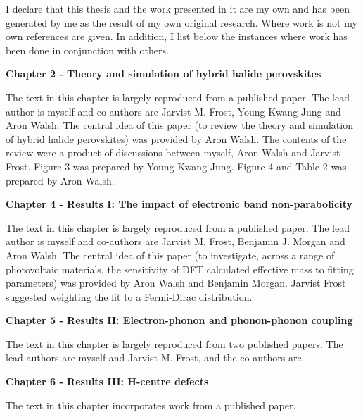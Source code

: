 I declare that this thesis and the work presented in it are my own and has been generated by me as the result of my own original research. Where work is not my own references are given. In addition, I list below the instances where work has been done in conjunction with others.
\vspace{\frontmatterbaselineskip}

\textbf{Chapter 2 - Theory and simulation of hybrid halide perovskites } 

The text in this chapter is largely reproduced from a published paper.\autocite{Whalley2017} The lead author is myself and co-authors are Jarvist M. Frost, Young-Kwang Jung and Aron Walsh.
The central idea of this paper (to review the theory and simulation of hybrid halide perovskites) was provided by Aron Walsh. The contents of the review were a product of discussions between myself, Aron Walsh and Jarvist Frost. Figure 3 was prepared by Young-Kwang Jung. Figure 4 and Table 2 was prepared by Aron Walsh. 

\vspace{\frontmatterbaselineskip}

\textbf{Chapter 4  - Results I: The impact of electronic band non-parabolicity}

The text in this chapter is largely reproduced from a published paper.\autocite{Whalley2019} The lead author is myself and co-authors are Jarvist M. Frost, Benjamin J. Morgan and Aron Walsh. The central idea of this paper (to investigate, across a range of photovoltaic materials, the sensitivity of DFT calculated effective mass to fitting parameters) was provided by Aron Walsh and Benjamin Morgan. Jarvist Frost suggested weighting the fit to a Fermi-Dirac distribution. 

\vspace{\frontmatterbaselineskip}

\textbf{Chapter 5  - Results II: Electron-phonon and phonon-phonon coupling}

The text in this chapter is largely reproduced from two published papers.\autocite{Whalley2016,Whalley2017a} The lead authors are myself\autocite{Whalley2016} and Jarvist M. Frost,\autocite{2017a} and the co-authors are 
\vspace{\frontmatterbaselineskip}

\textbf{Chapter 6  - Results III: H-centre defects}

The text in this chapter incorporates work from a published paper.